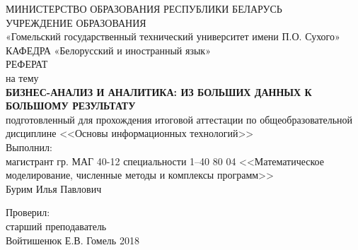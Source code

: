 \begin{titlepage}
	\large
	\begin{center}
		\vspace{3mm}
		МИНИСТЕРСТВО ОБРАЗОВАНИЯ РЕСПУБЛИКИ БЕЛАРУСЬ\\
		УЧРЕЖДЕНИЕ ОБРАЗОВАНИЯ\\
		«Гомельский государственный технический университет имени П.О. Сухого»\\
		\vspace{10mm}
		КАФЕДРА «Белорусский и иностранный язык»\\
		\vspace{30mm}
		РЕФЕРАТ\\
		на тему\\
			\textbf{\MakeTextUppercase{ Бизнес-анализ и аналитика: из больших данных к большому результату
		}}\\
	\vspace{5mm}
		подготовленный для прохождения итоговой аттестации 
		по общеобразовательной дисциплине 
		<<Основы информационных технологий>>\\
	\vspace{40mm}
		Выполнил:\\
		магистрант гр. МАГ 40-12
		специальности 1–40 80 04 <<Математическое моделирование, численные методы и комплексы программ>>\\
		Бурим Илья Павлович
		
	\vspace{15mm}
		Проверил:\\
		старший преподаватель\\
		Войтишенюк Е.В.
	\vfill
		Гомель 2018
	\end{center}
\end{titlepage}
